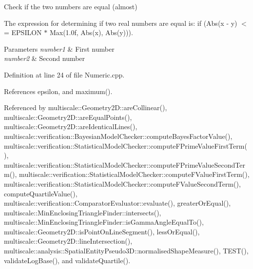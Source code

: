 Check if the two numbers are equal (almost) 

The expression for determining if two real numbers are equal is\-: if (Abs(x -\/ y) $<$= E\-P\-S\-I\-L\-O\-N $\ast$ Max(1.\-0f, Abs(x), Abs(y))).


\begin{DoxyParams}{Parameters}
{\em number1} & First number \\
\hline
{\em number2} & Second number \\
\hline
\end{DoxyParams}


Definition at line 24 of file Numeric.\-cpp.



References epsilon, and maximum().



Referenced by multiscale\-::\-Geometry2\-D\-::are\-Collinear(), multiscale\-::\-Geometry2\-D\-::are\-Equal\-Points(), multiscale\-::\-Geometry2\-D\-::are\-Identical\-Lines(), multiscale\-::verification\-::\-Bayesian\-Model\-Checker\-::compute\-Bayes\-Factor\-Value(), multiscale\-::verification\-::\-Statistical\-Model\-Checker\-::compute\-F\-Prime\-Value\-First\-Term(), multiscale\-::verification\-::\-Statistical\-Model\-Checker\-::compute\-F\-Prime\-Value\-Second\-Term(), multiscale\-::verification\-::\-Statistical\-Model\-Checker\-::compute\-F\-Value\-First\-Term(), multiscale\-::verification\-::\-Statistical\-Model\-Checker\-::compute\-F\-Value\-Second\-Term(), compute\-Quartile\-Value(), multiscale\-::verification\-::\-Comparator\-Evaluator\-::evaluate(), greater\-Or\-Equal(), multiscale\-::\-Min\-Enclosing\-Triangle\-Finder\-::intersects(), multiscale\-::\-Min\-Enclosing\-Triangle\-Finder\-::is\-Gamma\-Angle\-Equal\-To(), multiscale\-::\-Geometry2\-D\-::is\-Point\-On\-Line\-Segment(), less\-Or\-Equal(), multiscale\-::\-Geometry2\-D\-::line\-Intersection(), multiscale\-::analysis\-::\-Spatial\-Entity\-Pseudo3\-D\-::normalised\-Shape\-Measure(), T\-E\-S\-T(), validate\-Log\-Base(), and validate\-Quartile().



